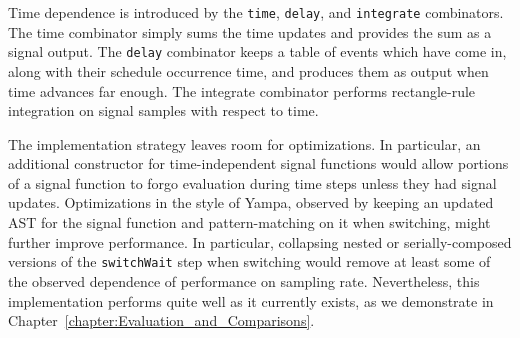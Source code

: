 Time dependence is introduced by the {\tt time}, {\tt delay}, and {\tt integrate}
combinators. The time combinator simply sums the time updates and provides the
sum as a signal output. The {\tt delay} combinator keeps a table of events
which have come in, along with their schedule occurrence time, and produces
them as output when time advances far enough. The integrate combinator performs
rectangle-rule integration on signal samples with respect to time.

The implementation strategy leaves room for optimizations. In particular, an
additional constructor for time-independent signal functions would allow
portions of a signal function to forgo evaluation during time steps unless they
had signal updates. Optimizations in the style of Yampa, observed by keeping
an updated AST for the signal function and pattern-matching on it when switching,
might further improve performance. In particular, collapsing nested or
serially-composed versions of the {\tt switchWait} step when switching would
remove at least some of the observed dependence of performance on sampling rate.
Nevertheless, this implementation performs quite well as it currently exists, as
we demonstrate in Chapter~\ref{chapter:Evaluation_and_Comparisons}.
